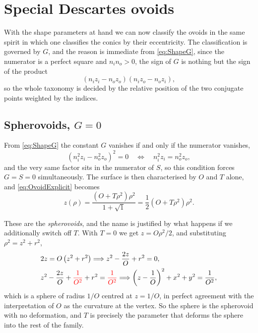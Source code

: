         \section{Special Descartes ovoids}

                With the shape parameters at hand we can now classify the ovoids in the same spirit in which one classifies the conics by their eccentricity. The classification is governed by $G$, and the reason is immediate from \ref{eq:ShapeG}, since the numerator is a perfect square and $n_in_o>0$, the sign of $G$ is nothing but the sign of the product
                \begin{equation}\label{eq:SignOfG}
                    \left( n_iz_i - n_oz_o \right)\left( n_iz_o - n_oz_i \right),
                \end{equation}
                so the whole taxonomy is decided by the relative position of the two conjugate points weighted by the indices.

            \subsection{Spherovoids, \texorpdfstring{$G=0$}{G = 0}}

                From \ref{eq:ShapeG} the constant $G$ vanishes if and only if the numerator vanishes,
                \begin{equation}\label{eq:SpherovoidCondition}
                    \left( n_i^2z_i - n_o^2z_o \right)^2 = 0 \quad\Longleftrightarrow\quad n_i^2z_i = n_o^2z_o,
                \end{equation}
                and the very same factor sits in the numerator of $S$, so this condition forces $G=S=0$ simultaneously. The surface is then characterised by $O$ and $T$ alone, and \ref{eq:OvoidExplicit} becomes
                \begin{equation}\label{eq:Spherovoid}
                    z(\rho) = \frac{\left( O+T\rho^2 \right)\rho^2}{1+\sqrt{1}} = \frac{1}{2}\left( O + T\rho^2 \right)\rho^2.
                \end{equation}

                These are the \emph{spherovoids}, and the name is justified by what happens if we additionally switch off $T$. With $T=0$ we get $z = O\rho^2/2$, and substituting $\rho^2 = z^2+r^2$,
                \begin{align*}
                    & 2z = O\left( z^2+r^2 \right) \Longrightarrow z^2 - \frac{2z}{O} + r^2 = 0,\\
                    & z^2 - \frac{2z}{O} + {\color{red}\frac{1}{O^2}} + r^2 = {\color{red}\frac{1}{O^2}} \Longrightarrow \left( z - \frac{1}{O} \right)^2 + x^2 + y^2 = \frac{1}{O^2},
                \end{align*}
                which is a sphere of radius $1/O$ centred at $z=1/O$, in perfect agreement with the interpretation of $O$ as the curvature at the vertex. So the sphere is the spherovoid with no deformation, and $T$ is precisely the parameter that deforms the sphere into the rest of the family.

